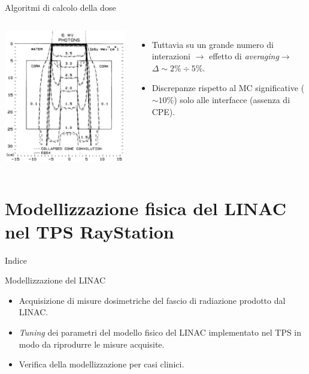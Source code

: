 \documentclass{beamer}
\begin{document}
\begin{frame}{Algoritmi di calcolo della dose}
\begin{columns}[t]
\includegraphics[width=\textwidth]{../cap1/kern_dens2_pres.png}
\scriptsize
\begin{itemize}
\item Tuttavia su un grande numero di interazioni $\rightarrow$ effetto di \textit{averaging}$\rightarrow$ $\Delta \sim 2\% \div 5\%$.
\item Discrepanze rispetto al MC significative ($\sim 10\%$) solo alle interfacce (assenza di CPE).
\end{itemize}
\end{columns}
\end{frame}



\section[Modellizzazione del LINAC]{Modellizzazione fisica del LINAC nel TPS RayStation}
\begin{frame}{Indice}
\tableofcontents[currentsection]
\end{frame}

\begin{frame}{Modellizzazione del LINAC}
\small
{}
\begin{itemize}
\item Acquisizione di misure dosimetriche del fascio di radiazione prodotto dal LINAC.
\item \textit{Tuning} dei parametri del modello fisico del LINAC implementato nel TPS in modo da riprodurre le misure acquisite.
\item Verifica della modellizzazione per casi clinici.
\end{itemize}
\end{frame}
\end{document}
